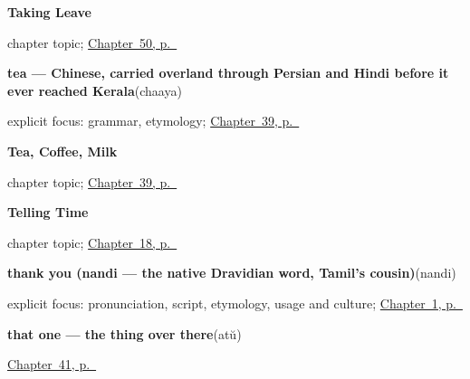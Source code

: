 \noindent\begin{minipage}[t]{\linewidth}
\raggedright
\textbf{Taking Leave}\par
\footnotesize chapter topic; \hyperref[ch:ml-taking-leave]{Chapter~50, p.~\pageref*{ch:ml-taking-leave}}
\end{minipage}\par\smallskip

\noindent\begin{minipage}[t]{\linewidth}
\raggedright
\textbf{tea — Chinese, carried overland through Persian and Hindi before it ever reached Kerala}\enspace\emph{}\enspace(chaaya)\par
\footnotesize explicit focus: grammar, etymology; \hyperref[ch:ml-tea-coffee-milk]{Chapter~39, p.~\pageref*{ch:ml-tea-coffee-milk}}
\end{minipage}\par\smallskip

\noindent\begin{minipage}[t]{\linewidth}
\raggedright
\textbf{Tea, Coffee, Milk}\par
\footnotesize chapter topic; \hyperref[ch:ml-tea-coffee-milk]{Chapter~39, p.~\pageref*{ch:ml-tea-coffee-milk}}
\end{minipage}\par\smallskip

\noindent\begin{minipage}[t]{\linewidth}
\raggedright
\textbf{Telling Time}\par
\footnotesize chapter topic; \hyperref[ch:ml-telling-time]{Chapter~18, p.~\pageref*{ch:ml-telling-time}}
\end{minipage}\par\smallskip

\noindent\begin{minipage}[t]{\linewidth}
\raggedright
\textbf{thank you (nandi — the native Dravidian word, Tamil's cousin)}\enspace\emph{}\enspace(nandi)\par
\footnotesize explicit focus: pronunciation, script, etymology, usage and culture; \hyperref[ch:greetings]{Chapter~1, p.~\pageref*{ch:greetings}}
\end{minipage}\par\smallskip

\noindent\begin{minipage}[t]{\linewidth}
\raggedright
\textbf{that one — the thing over there}\enspace\emph{}\enspace(atŭ)\par
\footnotesize \hyperref[ch:ml-pointing-and-asking]{Chapter~41, p.~\pageref*{ch:ml-pointing-and-asking}}
\end{minipage}\par\smallskip

